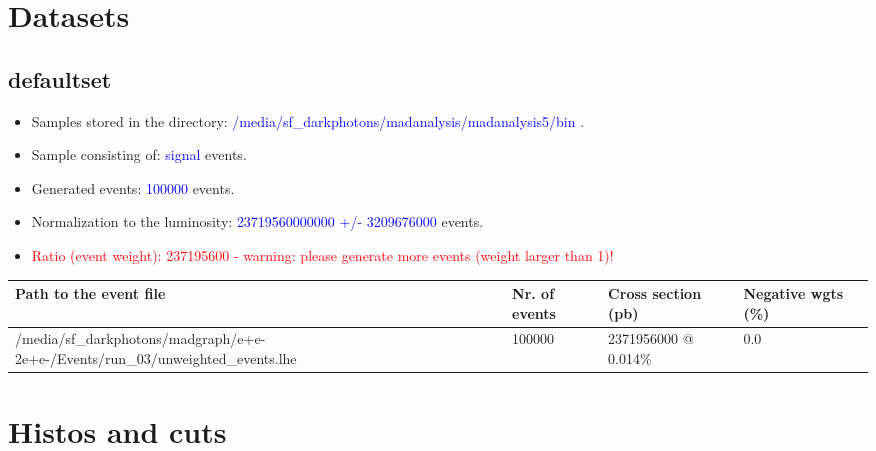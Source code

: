 \documentclass[a4paper, 11pt]{article}
\begin{document}
\section{ Datasets}

\subsection{ defaultset}

\begin{itemize}
  \item Samples stored in the directory: \textcolor{blue}{/\-media/\-sf\_darkphotons/\-madanalysis/\-madanalysis5/\-bin} .
   \item Sample consisting of: \textcolor{blue}{signal}  events.
   \item Generated events: \textcolor{blue}{100000 }  events.
   \item Normalization to the luminosity: \textcolor{blue}{23719560000000}\textcolor{blue}{ +/\-- }\textcolor{blue}{3209676000 }  events.
   \item\textcolor{red}{Ratio (event weight): }\textcolor{red}{237195600 }\textcolor{red}{ - warning: please generate more events (weight larger than 1)!}
\textcolor{red}{}
\end{itemize}
\begin{table}[!h]
  \begin{center}
    \begin{tabular}{|m{51.0mm}|m{24.0mm}|m{28.0mm}|m{28.0mm}|}
      \hline
      \cellcolor{yellow}         Path to the event file& \cellcolor{yellow}         Nr. of events& \cellcolor{yellow}         Cross section (pb)& \cellcolor{yellow}         Negative wgts (\%)\\
      \hline
      \cellcolor{white}          /\-media/\-sf\_darkphotons/\-madgraph/\-e+e-2e+e-/\-Events/\-run\_03/\-unweighted\_events.lhe& \cellcolor{white}          100000& \cellcolor{white}          2371956000 @ 0.014\%& \cellcolor{white}          0.0\\
\hline
    \end{tabular}
  \end{center}
\end{table}

\newpage
\section{ Histos and cuts}
\end{document}
